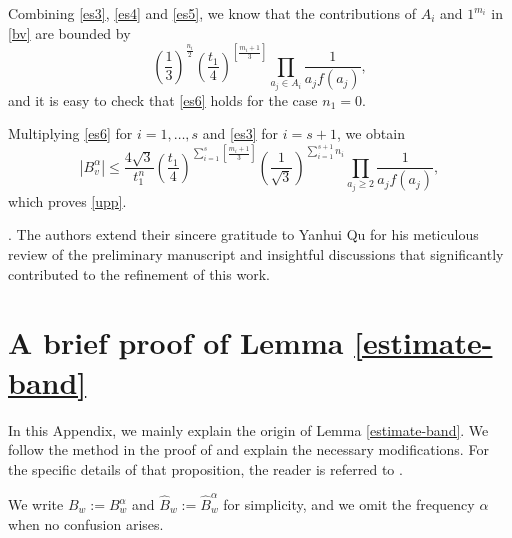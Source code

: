 \documentclass[reqno,11pt,graphicx,]{amsart}
\numberwithin{equation}{section}
\theoremstyle{plain}
\newcommand{\3}{\mathbf{3}}
\begin{document}
	Combining \eqref{es3}, \eqref{es4} and \eqref{es5}, we know that the contributions of $A_i$ and $1^{m_i}$ in \eqref{bv} are bounded by 
	\begin{equation}\label{es6}		\left(\frac1{3}\right)^{\frac{n_i}{2}}\left(\frac{t_1}{4}\right)^{\left[\frac{m_i+1}{3}\right]}
\prod_{a_j\in A_i}\frac{1}{a_j f(a_j)},
	\end{equation}
	and it is easy to check that \eqref{es6} holds for the case $n_1=0$.
	
	Multiplying \eqref{es6} for $i=1,\ldots,s$ and \eqref{es3} for $i=s+1$, we obtain
	\begin{equation*}
		|B_v^\alpha|\le \frac{4\sqrt3}{t_1^n} \left(\frac{t_1}{4}\right)^{\sum_{i=1}^s
			\left[\frac{m_i+1}{3}\right]}
		\left(\frac1{\sqrt3}\right)^{\sum_{i=1}^{s+1}n_i} 
		\prod_{a_j\ge 2}\frac{1}{a_j f(a_j)},
	\end{equation*}
	which proves \eqref{upp}.

	\smallskip
	.
	The authors extend their sincere gratitude to Yanhui Qu for his meticulous review of the preliminary manuscript and insightful discussions that significantly contributed to the refinement of this work. 

	\appendix
	\section{A brief proof of Lemma \ref{estimate-band}}\label{exp}
	In this Appendix, we mainly explain the origin of Lemma \ref{estimate-band}. We follow the method in the proof of \cite[Lemma 3.7]{LQW2014} and explain the necessary modifications. For the specific details of that proposition, the reader is referred to \cite[Propositions 3.1, 3.2 and 3.3]{FLW2011}.
	
	We write $B_w:=B^{\alpha}_{w}$ and $\hat{B}_w:=\hat{B}^{\alpha}_{w}$ for simplicity, and we omit the frequency $\alpha$ when no confusion arises.
	
\end{document}

